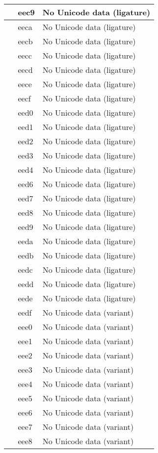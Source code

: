 \documentclass[12pt,letterpaper,openany]{book}
\begin{document}
\begin{center}
\begin{supertabular}{|m{0.25in}|m{0.5in}|m{4in}|}
 & eec9 & No Unicode data (ligature)\\\hline
 & eeca & No Unicode data (ligature)\\\hline
 & eecb & No Unicode data (ligature)\\\hline
 & eecc & No Unicode data (ligature)\\\hline
 & eecd & No Unicode data (ligature)\\\hline
 & eece & No Unicode data (ligature)\\\hline
 & eecf & No Unicode data (ligature)\\\hline
 & eed0 & No Unicode data (ligature)\\\hline
 & eed1 & No Unicode data (ligature)\\\hline
 & eed2 & No Unicode data (ligature)\\\hline
 & eed3 & No Unicode data (ligature)\\\hline
 & eed4 & No Unicode data (ligature)\\\hline
 & eed6 & No Unicode data (ligature)\\\hline
 & eed7 & No Unicode data (ligature)\\\hline
 & eed8 & No Unicode data (ligature)\\\hline
 & eed9 & No Unicode data (ligature)\\\hline
 & eeda & No Unicode data (ligature)\\\hline
 & eedb & No Unicode data (ligature)\\\hline
 & eedc & No Unicode data (ligature)\\\hline
 & eedd & No Unicode data (ligature)\\\hline
 & eede & No Unicode data (ligature)\\\hline
 & eedf & No Unicode data (variant)\\\hline
 & eee0 & No Unicode data (variant)\\\hline
 & eee1 & No Unicode data (variant)\\\hline
 & eee2 & No Unicode data (variant)\\\hline
 & eee3 & No Unicode data (variant)\\\hline
 & eee4 & No Unicode data (variant)\\\hline
 & eee5 & No Unicode data (variant)\\\hline
 & eee6 & No Unicode data (variant)\\\hline
 & eee7 & No Unicode data (variant)\\\hline
 & eee8 & No Unicode data (variant)\\\hline

\end{supertabular}
\end{center}
\end{document}
